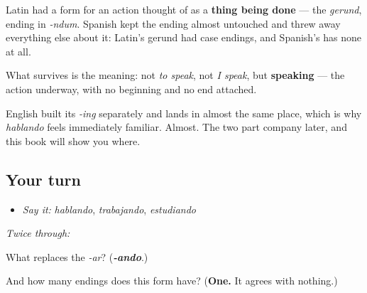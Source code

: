 \begin{cousinweb}
Latin had a form for an action thought of as a \textbf{thing being done} — the \emph{gerund}, ending in \emph{-ndum}. Spanish kept the ending almost untouched and threw away everything else about it: Latin's gerund had case endings, and Spanish's has none at all.

What survives is the meaning: not \emph{to speak}, not \emph{I speak}, but \textbf{speaking} — the action underway, with no beginning and no end attached.

English built its \emph{-ing} separately and lands in almost the same place, which is why \emph{hablando} feels immediately familiar. Almost. The two part company later, and this book will show you where.
\end{cousinweb}

\subsection*{Your turn}
\begin{itemize}
\raggedright
  \item \emph{Say it:} \emph{hablando}, \emph{trabajando}, \emph{estudiando}
\end{itemize}

\emph{Twice through:}

\begin{tcolorbox}[breakable,colback=teal!4,colframe=teal!35!black,title={Before you move on}]
What replaces the \emph{-ar}? (\emph{\textbf{-ando}}.)

And how many endings does this form have? (\textbf{One.} It agrees with nothing.)
\end{tcolorbox}

